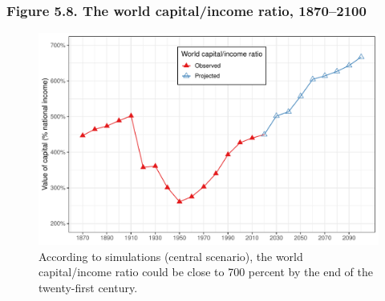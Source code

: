 \documentclass[t]{beamer}\usepackage[]{graphicx}\usepackage[]{color}
\newenvironment{knitrout}{}{} %
\begin{document}
\begin{frame}[label=Figure_5_8]
\frametitle{Figure 5.8. The world capital/income ratio, 1870--2100}
\begin{figure}[t]
\begin{minipage}[b]{\textwidth}
\centering
\begin{knitrout}\footnotesize
{}\color{fgcolor}

{\centering \includegraphics[width=1\linewidth]{figures/color/Figure_5_8} 

}



\end{knitrout}
\caption{According to simulations (central scenario), the world capital/income ratio could be close to 700 percent by the end of the twenty-first century.}
\end{minipage}
\end{figure}
\end{frame}
\end{document}

